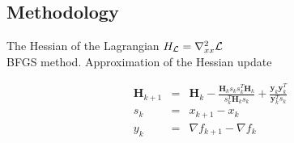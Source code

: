 \documentclass[Space3_Assign3.tex]{subfile}
\begin{document}
\subsection{Methodology}






The Hessian of the Lagrangian $H_{\mathcal{L}} = \nabla^2_{xx}\mathcal{L}$\\
BFGS method. Approximation of the Hessian update

\begin{eqnarray}
\bm{H}_{k+1} &=& \bm{H}_k - \frac{\bm{H}_k s_k s_k^T \bm{H}_k}{s_k^T \bm{H}_k s_k} + \frac{\bm{y}_k\bm{y}_k^T}{\bm{y}_k^T s_k}\\
s_k &=& x_{k+1} - x_k\\
y_k &=& \nabla f_{k+1} - \nabla f_k
\end{eqnarray}
\end{document}
